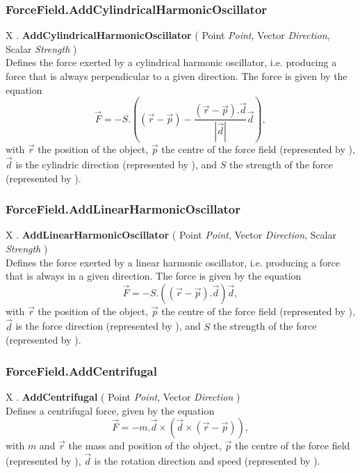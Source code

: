 \subsubsection{ForceField.AddCylindricalHarmonicOscillator \label{F:ForceField:AddCylindricalHarmonicOscillator}}
X . \textbf{AddCylindricalHarmonicOscillator} ( Point \textit{Point}, Vector \textit{Direction}, Scalar \textit{Strength} ) \\
Defines the force exerted by a cylindrical harmonic oscillator, i.e. producing a force that is always perpendicular to a given direction.
The force is given by the equation
\begin{equation}
\vec{F}= - S . 
\left(
(\vec{r}-\vec{p})
- \frac{(\vec{r}-\vec{p}). \vec{d}}{|\vec{d}|} \vec{d}
\right)
,
\end{equation}
with $\vec{r}$ the position of the object, $\vec{p}$ the centre of the force field (represented by ), $\vec{d}$ is the cylindric direction (represented by ), and $S$ the strength of the force (represented by ).



\subsubsection{ForceField.AddLinearHarmonicOscillator \label{F:ForceField:AddLinearHarmonicOscillator}}
X . \textbf{AddLinearHarmonicOscillator} ( Point \textit{Point}, Vector \textit{Direction}, Scalar \textit{Strength} ) \\
Defines the force exerted by a linear harmonic oscillator, i.e. producing a force that is always in a given direction.
The force is given by the equation
\begin{equation}
\vec{F}= - S . 
((\vec{r}-\vec{p}). \vec{d}) \vec{d}
,
\end{equation}
with $\vec{r}$ the position of the object, $\vec{p}$ the centre of the force field (represented by ), $\vec{d}$ is the force direction (represented by ), and $S$ the strength of the force (represented by ).



\subsubsection{ForceField.AddCentrifugal \label{F:ForceField:AddCentrifugal}}
X . \textbf{AddCentrifugal} ( Point \textit{Point}, Vector \textit{Direction} ) \\
Defines a centrifugal force, given by the equation
\begin{equation}
\vec{F}= - m . \vec{d} \times ( \vec{d} \times (\vec{r}-\vec{p}) )
,
\end{equation}
with $m$ and $\vec{r}$ the mass and position of the object, $\vec{p}$ the centre of the force field (represented by ), $\vec{d}$ is the rotation direction and speed (represented by ).



